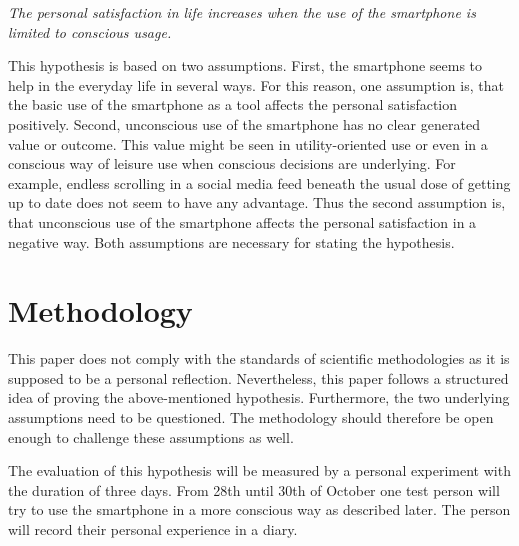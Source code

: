 \documentclass[11pt,a4paper]{article}
\begin{document}
\begin{center}
\textit{The personal satisfaction in life increases when the use of the smartphone is limited to conscious usage.}
 \end{center}

This hypothesis is based on two assumptions. First, the smartphone seems to help in the everyday life in several ways. For this reason, one assumption is, that the basic use of the smartphone as a tool affects the personal satisfaction positively. Second, unconscious use of the smartphone has no clear generated value or outcome. This value might be seen in utility-oriented use or even in a conscious way of leisure use when conscious decisions are underlying. For example, endless scrolling in a social media feed beneath the usual dose of getting up to date does not seem to have any advantage. Thus the second assumption is, that unconscious use of the smartphone affects the personal satisfaction in a negative way. Both assumptions are necessary for stating the hypothesis. 

\section*{Methodology}
This paper does not comply with the standards of scientific methodologies as it is supposed to be a personal reflection. Nevertheless, this paper follows a structured idea of proving the above-mentioned hypothesis. Furthermore, the two underlying assumptions need to be questioned. The methodology should therefore be open enough to challenge these assumptions as well. 

The evaluation of this hypothesis will be measured by a personal experiment with the duration of three days. From 28th until 30th of October one test person will try to use the smartphone in a more conscious way as described later. The person will record their personal experience in a diary. 
\end{document}
